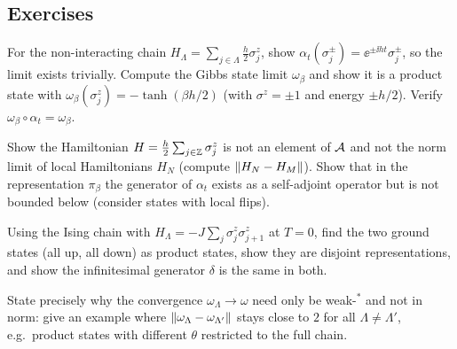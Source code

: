 \subsection*{Exercises}
\begin{exercise}\label{ex:quasilocal:1}
For the non-interacting chain $H_\Lambda=\sum_{j\in\Lambda}\frac h2\sigma^z_j$, show $\alpha_t(\sigma^\pm_j)=\ee^{\pm\ii ht}\sigma^\pm_j$, so the limit exists trivially. Compute the Gibbs state limit $\omega_\beta$ and show it is a product state with $\omega_\beta(\sigma^z_j)=-\tanh(\beta h/2)$ (with $\sigma^z=\pm1$ and energy $\pm h/2$). Verify $\omega_\beta\circ\alpha_t=\omega_\beta$.
\end{exercise}
\begin{exercise}\label{ex:quasilocal:2}
Show the Hamiltonian $H=\frac h2\sum_{j\in\mathbb{Z}}\sigma_j^z$ is not an element of $\mathcal{A}$ and not the norm limit of local Hamiltonians $H_N$ (compute $\lVert H_N-H_M\rVert$). Show that in the representation $\pi_\beta$ the generator of $\alpha_t$ exists as a self-adjoint operator but is not bounded below (consider states with local flips).
\end{exercise}
\begin{exercise}\label{ex:quasilocal:3}
Using the Ising chain with $H_\Lambda=-J\sum_j\sigma_j^z\sigma_{j+1}^z$ at $T=0$, find the two ground states (all up, all down) as product states, show they are disjoint representations, and show the infinitesimal generator $\delta$ is the same in both.
\end{exercise}
\begin{exercise}\label{ex:quasilocal:4}
State precisely why the convergence $\omega_\Lambda\to\omega$ need only be weak-$^*$ and not in norm: give an example where $\lVert \omega_\Lambda-\omega_{\Lambda'}\rVert$ stays close to $2$ for all $\Lambda\neq\Lambda'$, e.g.\ product states with different $\theta$ restricted to the full chain.
\end{exercise}

